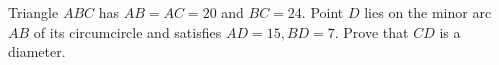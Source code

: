 Triangle $ABC$ has $AB=AC=20$ and $BC=24$. Point $D$ lies on the minor arc $AB$ of its circumcircle and satisfies $AD=15,BD=7$. Prove that $CD$ is a diameter.
